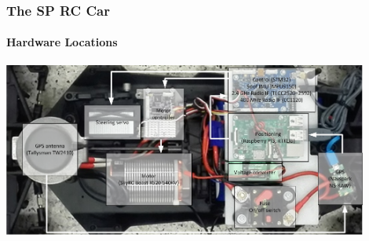 \documentclass[aspectratio=169,electronics,notopline]{beamer}
\begin{document}
\begin{frame} 
\frametitle{The SP RC Car}
\framesubtitle{Hardware Locations}
\begin{center}
	\includegraphics[width=12cm]{Figures/car_overview.png}
\end{center}
\end{frame}
\end{document}
